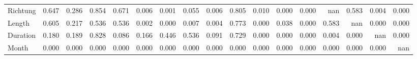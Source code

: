 \begin{tabular}{lrrrrrrrrrrrrrrrr}
Richtung & 0.647 & 0.286 & 0.854 & 0.671 &  0.006 &  0.001 & 0.055 &  0.006 &  0.805 & 0.010 & 0.000 &   0.000 &       nan &   0.583 &     0.004 &  0.000 \\
Length   & 0.605 & 0.217 & 0.536 & 0.536 &  0.002 &  0.000 & 0.007 &  0.004 &  0.773 & 0.000 & 0.038 &   0.000 &     0.583 &     nan &     0.000 &  0.000 \\
Duration & 0.180 & 0.189 & 0.828 & 0.086 &  0.166 &  0.446 & 0.536 &  0.091 &  0.729 & 0.000 & 0.000 &   0.000 &     0.004 &   0.000 &       nan &  0.000 \\
Month    & 0.000 & 0.000 & 0.000 & 0.000 &  0.000 &  0.000 & 0.000 &  0.000 &  0.000 & 0.000 & 0.000 &   0.000 &     0.000 &   0.000 &     0.000 &    nan \\
\bottomrule
\end{tabular}
